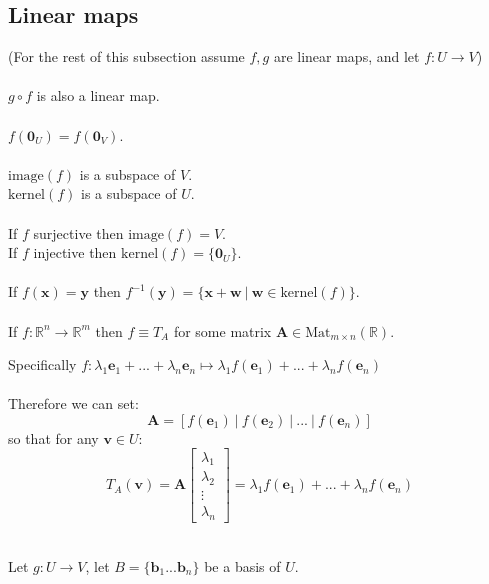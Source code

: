 \documentclass{scrartcl}
\newcommand{\R}{\mathbb{R}}
\renewcommand{\vec}[1]{\mathbf{#1}}
\begin{document}
\subsection{Linear maps}
(For the rest of this subsection assume $ f, g $ are linear maps, and let $ f : U \to V $)
\\\\
$ g \circ f $ is also a linear map.
\\\\
$ f(\vec{0}_{U}) = f(\vec{0}_{V}) $.
\\\\
$ \textrm{image}(f) $ is a subspace of $ V $.
\\
$ \textrm{kernel}(f) $ is a subspace of $ U $.
\\\\
If $ f $ surjective then $ \textrm{image}(f) = V $.
\\
If $ f $ injective then $ \textrm{kernel}(f) = \{\vec{0}_{U}\} $.
\\\\
If $ f(\vec{x}) = \vec{y} $ then $ f^{-1}(\vec{y}) = \{\vec{x} + \vec{w} \ | \ \vec{w} \in \textrm{kernel}(f) \} $.
\\\\
If $ f : \R^{n} \to \R^{m} $ then $ f \equiv T_{A} $ for some matrix $ \vec{A}  \in \textrm{Mat}_{m \times n}(\R) $.
\\
\begin{tcolorbox}[breakable]
Specifically $ f : \lambda_{1}\vec{e}_{1} + ... + \lambda_{n}\vec{e}_{n} \mapsto \lambda_{1}f(\vec{e}_{1}) + ... + \lambda_{n}f(\vec{e}_{n}) $
\\\\
Therefore we can set:
\begin{equation}
\vec{A} = [f(\vec{e}_{1}) \ | \ f(\vec{e}_{2}) \ | \ ... \ |\  f(\vec{e}_{n})]
\end{equation}
so that for any $ \vec{v} \in U $:
\begin{equation}
T_{A}(\vec{v}) = \vec{A}
\begin{bmatrix}
\lambda_{1} \\ \lambda_{2} \\ \vdots \\ \lambda_{n}
\end{bmatrix}
= \lambda_{1}f(\vec{e}_{1}) + ... + \lambda_{n}f(\vec{e}_{n})
\end{equation}
\end{tcolorbox}
\noindent
\\
Let $ g : U \to V $, let $ B = \{\vec{b}_{1}...\vec{b}_{n}\} $ be a basis of $ U $.
\end{document}
